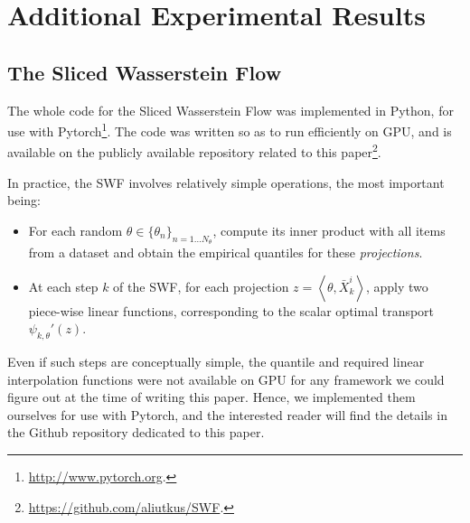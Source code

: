 





\section{Additional Experimental Results}

\subsection{The Sliced Wasserstein Flow}
The whole code for the Sliced Wasserstein Flow was implemented in Python, for use with Pytorch\footnote{\url{http://www.pytorch.org}.}. The code was written so as to run efficiently on GPU, and is available on the publicly available repository related to this paper\footnote{\url{https://github.com/aliutkus/SWF}.}.

In practice, the SWF involves relatively simple operations, the most important being:
\begin{itemize}
  \item For each random $\theta\in\{\theta_n\}_{n=1\dots N_\theta}$,  compute its inner product with all items from a dataset and obtain the empirical quantiles for these \emph{projections}.
  \item At each step $k$ of the SWF, for each projection $z=\left<\theta, \bar{X}^i_k\right>$, apply two piece-wise linear functions, corresponding to the scalar optimal transport $\psi_{k, \theta}'(z)$.
\end{itemize}
Even if such steps are conceptually simple, the quantile and required linear interpolation functions were not available on GPU for any framework we could figure out at the time of writing this paper. Hence, we implemented them ourselves for use with Pytorch, and the interested reader will find the details in the Github repository dedicated to this paper.

